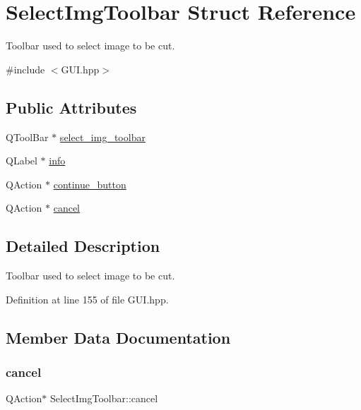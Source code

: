 \hypertarget{structSelectImgToolbar}{}\section{Select\+Img\+Toolbar Struct Reference}
\label{structSelectImgToolbar}


Toolbar used to select image to be cut.  




{\ttfamily \#include $<$G\+U\+I.\+hpp$>$}

\subsection*{Public Attributes}
\begin{DoxyCompactItemize}
\item 
Q\+Tool\+Bar $\ast$ \mbox{\hyperlink{structSelectImgToolbar_a779bc326cf08c9fbcd1ffebb43a664eb}{select\+\_\+img\+\_\+toolbar}}
\item 
Q\+Label $\ast$ \mbox{\hyperlink{structSelectImgToolbar_a3cf6ac92fbe60877873c89939217e1de}{info}}
\item 
Q\+Action $\ast$ \mbox{\hyperlink{structSelectImgToolbar_a82569764f9d7e13b406a668e9e50290a}{continue\+\_\+button}}
\item 
Q\+Action $\ast$ \mbox{\hyperlink{structSelectImgToolbar_a0b17a222dff0441c0f10509315ce9052}{cancel}}
\end{DoxyCompactItemize}


\subsection{Detailed Description}
Toolbar used to select image to be cut. 

Definition at line 155 of file G\+U\+I.\+hpp.



\subsection{Member Data Documentation}
\mbox{\label{structSelectImgToolbar_a0b17a222dff0441c0f10509315ce9052}} 
\subsubsection{\texorpdfstring{cancel}{cancel}}
{\footnotesize\ttfamily Q\+Action$\ast$ Select\+Img\+Toolbar\+::cancel}

